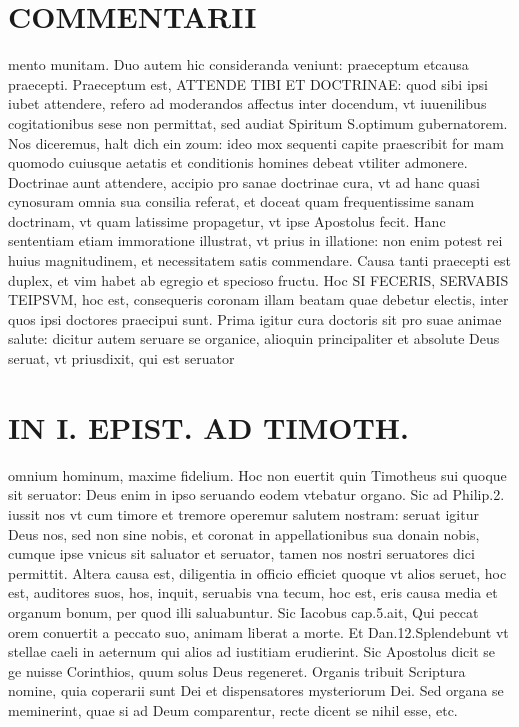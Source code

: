 \documentclass{article}
\begin{document}
\begin{pages}
\section*{COMMENTARII }
\marginpar{[ p.114 ]}\pstart mento munitam. Duo autem hic consideranda veniunt: praeceptum etcausa praecepti. Praeceptum est, ATTENDE TIBI ET DOCTRINAE: quod sibi ipsi iubet attendere, refero ad moderandos affectus inter docendum, vt iuuenilibus cogitationibus sese non permittat, sed audiat Spiritum S.optimum gubernatorem. Nos diceremus, halt dich ein zoum: ideo mox sequenti capite praescribit for mam quomodo cuiusque aetatis et conditionis homines debeat vtiliter admonere.  \pend\pstart Doctrinae aunt attendere, accipio pro sanae doctrinae cura, vt ad hanc quasi cynosuram omnia sua consilia referat, et doceat quam frequentissime sanam doctrinam, vt quam latissime propagetur, vt ipse Apostolus fecit. Hanc sententiam etiam immoratione illustrat, vt prius in illatione: non enim potest rei huius magnitudinem, et necessitatem satis commendare.  \pend\pstart Causa tanti praecepti est duplex, et vim habet ab egregio et specioso fructu. Hoc SI FECERIS, SERVABIS TEIPSVM, hoc est, consequeris coronam illam beatam quae debetur electis, inter quos ipsi doctores praecipui sunt. Prima igitur cura doctoris sit pro suae animae salute: dicitur autem seruare se organice, alioquin principaliter et absolute Deus seruat, vt priusdixit, qui est seruator  \pend
\section*{IN I. EPIST. AD TIMOTH. }
\marginpar{[ p.115 ]}\pstart omnium hominum, maxime fidelium. Hoc non euertit quin Timotheus sui quoque sit seruator: Deus enim in ipso seruando eodem vtebatur organo. Sic ad Philip.2. iussit nos vt cum timore et tremore operemur salutem nostram: seruat igitur Deus nos, sed non sine nobis, et coronat in appellationibus sua donain nobis, cumque ipse vnicus sit saluator et seruator, tamen nos nostri seruatores dici permittit.  \pend\pstart Altera causa est, diligentia in officio efficiet quoque vt alios seruet, hoc est, auditores suos, hos, inquit, seruabis vna tecum, hoc est, eris causa media et organum bonum, per quod illi saluabuntur. Sic Iacobus cap.5.ait, Qui peccat orem conuertit a peccato suo, animam liberat a morte. Et Dan.12.Splendebunt vt stellae caeli in aeternum qui alios ad iustitiam erudierint. Sic Apostolus dicit se ge nuisse Corinthios, quum solus Deus regeneret.  \pend\pstart Organis tribuit Scriptura nomine, quia coperarii sunt Dei et dispensatores mysteriorum Dei. Sed organa se meminerint, quae si ad Deum comparentur, recte dicent se nihil esse, etc.  \pend

\end{pages}
\end{document}

